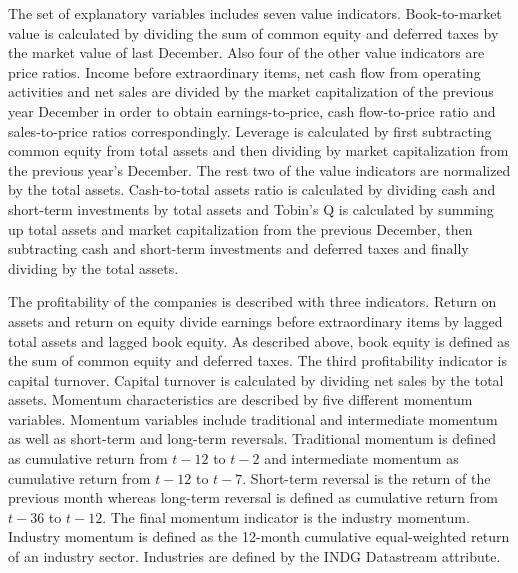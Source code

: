 \documentclass[12pt]{article}
\begin{document}
The set of explanatory variables includes seven value indicators. Book-to-market value is calculated by dividing the sum of common equity and deferred taxes by the market value of last December. Also four of the other value indicators are price ratios. Income before extraordinary items, net cash flow from operating activities and net sales are divided by the market capitalization of the previous year December in order to obtain earnings-to-price, cash flow-to-price ratio and sales-to-price ratios correspondingly. Leverage is calculated by first subtracting common equity from total assets and then dividing by market capitalization from the previous year's December. The rest two of the value indicators are normalized by the total assets. Cash-to-total assets ratio is calculated by dividing cash and short-term investments by total assets and Tobin's Q is calculated by summing up total assets and market capitalization from the previous December, then subtracting cash and short-term investments and deferred taxes and finally dividing by the total assets. \par

The profitability of the companies is described with three indicators. Return on assets and return on equity divide earnings before extraordinary items by lagged total assets and lagged book equity. As described above, book equity is defined as the sum of common equity and deferred taxes. The third profitability indicator is capital turnover. Capital turnover is calculated by dividing net sales by the total assets. Momentum characteristics are described by five different momentum variables. Momentum variables include traditional and intermediate momentum as well as short-term and long-term reversals. Traditional momentum is defined as cumulative return from $t-12$ to $t-2$ and intermediate momentum as cumulative return from $t-12$ to $t-7$. Short-term reversal is the return of the previous month whereas long-term reversal is defined as cumulative return from $t-36$ to $t-12$. The final momentum indicator is the industry momentum. Industry momentum is defined as the 12-month cumulative equal-weighted return of an industry sector. Industries are defined by the INDG Datastream attribute. \par
\end{document}
